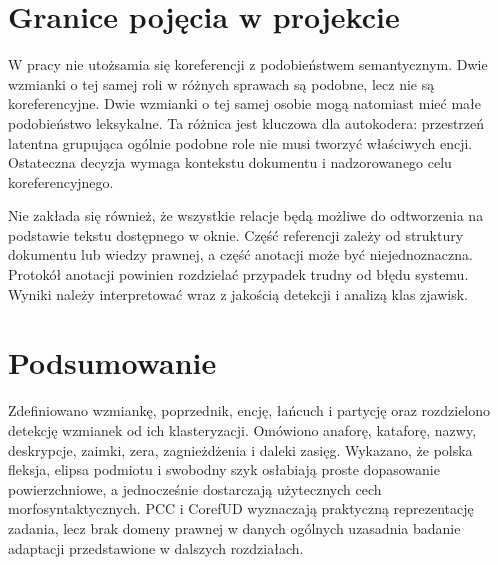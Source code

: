 \section{Granice pojęcia w projekcie}
\label{sec:granice-coref}

W pracy nie utożsamia się koreferencji z podobieństwem semantycznym. Dwie wzmianki o tej samej roli w różnych sprawach są podobne, lecz nie są koreferencyjne. Dwie wzmianki o tej samej osobie mogą natomiast mieć małe podobieństwo leksykalne. Ta różnica jest kluczowa dla autokodera: przestrzeń latentna grupująca ogólnie podobne role nie musi tworzyć właściwych encji. Ostateczna decyzja wymaga kontekstu dokumentu i nadzorowanego celu koreferencyjnego.

Nie zakłada się również, że wszystkie relacje będą możliwe do odtworzenia na podstawie tekstu dostępnego w oknie. Część referencji zależy od struktury dokumentu lub wiedzy prawnej, a część anotacji może być niejednoznaczna. Protokół anotacji powinien rozdzielać przypadek trudny od błędu systemu. Wyniki należy interpretować wraz z jakością detekcji i analizą klas zjawisk.

\section{Podsumowanie}

Zdefiniowano wzmiankę, poprzednik, encję, łańcuch i partycję oraz rozdzielono detekcję wzmianek od ich klasteryzacji. Omówiono anaforę, kataforę, nazwy, deskrypcje, zaimki, zera, zagnieżdżenia i daleki zasięg. Wykazano, że polska fleksja, elipsa podmiotu i swobodny szyk osłabiają proste dopasowanie powierzchniowe, a jednocześnie dostarczają użytecznych cech morfosyntaktycznych. PCC i CorefUD wyznaczają praktyczną reprezentację zadania, lecz brak domeny prawnej w danych ogólnych uzasadnia badanie adaptacji przedstawione w dalszych rozdziałach.
